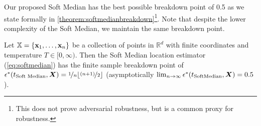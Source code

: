 \documentclass[sigconf, review]{acmart}
\newcommand{\features}{\mX}
\newcommand{\featset}{\sX}
\begin{document}
Our proposed Soft Median has the best possible breakdown point of 0.5 as we state formally in \autoref{theorem:softmedianbreakdown}\footnote{This does not prove adversarial robustness, but is a common proxy for robustness.}. Note that despite the lower complexity of the Soft Median, we maintain the same breakdown point.

\begin{theorem}\label{theorem:softmedianbreakdown}
  Let \(\featset = \{ \mathbf{\mathbf{x}}_1, \dots, \mathbf{\mathbf{x}}_n\} \) be a collection of points in \(\mathbb{R}^d\) with finite coordinates and temperature \(T \in [0, \infty) \). Then the Soft Median location estimator (\autoref{eq:softmedian}) has the finite sample breakdown point of \(\epsilon^*(t_{\text{Soft Median}}, \features) = \nicefrac{1}{n} \lfloor \nicefrac{(n+1)}{2}\rfloor \) (asymptotically \( \lim_{n \to \infty} \epsilon^*(t_{\text{SoftMedian}}, \features) = 0.5 \)).
\end{theorem}
\end{document}
